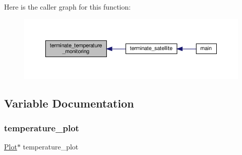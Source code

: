 Here is the caller graph for this function\+:
\nopagebreak
\begin{figure}[H]
\begin{center}
\leavevmode
\includegraphics[width=350pt]{temperature-monitoring_8h_a8b1be00dadac2a3d808233430fb2cf8b_icgraph}
\end{center}
\end{figure}


\subsection{Variable Documentation}
\mbox{\label{temperature-monitoring_8h_a54a4a2add118156b66234393348c169d}} 
\subsubsection{\texorpdfstring{temperature\+\_\+plot}{temperature\_plot}}
{\footnotesize\ttfamily \hyperlink{structPlot}{Plot}$\ast$ temperature\+\_\+plot}

